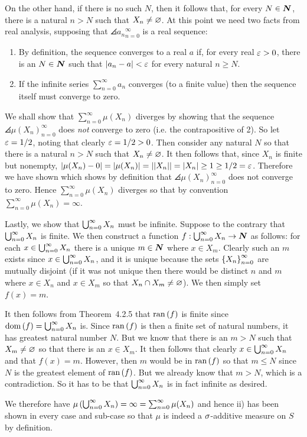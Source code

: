{{    On the other hand, if there is no such $N$, then it follows that, for every $N \in {\boldsymbol{N}}$, there is a natural $n > N$ such that $X_n \neq \varnothing$.
    At this point we need two facts from real analysis, supposing that $\angles{a_n}_{n=0}^\infty$ is a real sequence:
    \begin{enumerate}
    \item By definition, the sequence converges to a real $a$ if, for every real $\varepsilon > 0$, there is an $N \in {\boldsymbol{N}}$ such that $\left| a_n - a \right| < \varepsilon$ for every natural $n \geq N$.
    \item If the infinite series $\sum_{n=0}^\infty a_n$ converges (to a finite value) then the sequence itself must converge to zero.
    \end{enumerate}
    We shall show that $\sum_{n=0}^\infty \mu(X_n)$ diverges by showing that the sequence $\angles{\mu(X_n)}_{n=0}^\infty$ does \emph{not} converge to zero (i.e. the contrapositive of 2).
    So let $\varepsilon = 1/2$, noting that clearly $\varepsilon = 1/2 > 0$.
    Then consider any natural $N$ so that there is a natural $n > N$ such that $X_n \neq \varnothing$.
    It then follows that, since $X_n$ is finite but nonempty, $\left| \mu(X_n) - 0 \right| = \left| \mu(X_n) \right| = \left| \left| X_n \right| \right| = \left| X_n \right| \geq 1 \geq 1/2 = \varepsilon$.
    Therefore we have shown
    which shows by definition that $\angles{\mu(X_n)}_{n=0}^\infty$ does not converge to zero.
    Hence $\sum_{n=0}^\infty \mu(X_n)$ diverges so that by convention $\sum_{n=0}^\infty \mu(X_n) = \infty$.

    Lastly, we show that $\bigcup_{n=0}^\infty X_n$ must be infinite.
    Suppose to the contrary that $\bigcup_{n=0}^\infty X_n$ is finite.
    We then construct a function $f : \bigcup_{n=0}^\infty X_n \to {\boldsymbol{N}}$ as follows: for each $x \in \bigcup_{n=0}^\infty X_n$ there is a unique $m \in {\boldsymbol{N}}$ where $x \in X_m$.
    Clearly such an $m$ exists since $x \in \bigcup_{n=0}^\infty X_n$, and it is unique because the sets $\left\{ X_n \right\}_{n=0}^\infty$ are mutually disjoint (if it was not unique then there would be distinct $n$ and $m$ where $x \in X_n$ and $x \in X_m$ so that $X_n \cap X_m \neq \varnothing$).
    We then simply set $f(x) = m$.

    It then follows from Theorem~4.2.5 that $\mathrm{ran}\,(f)$ is finite since $\mathrm{dom}\,(f) = \bigcup_{n=0}^\infty X_n$ is.
    Since $\mathrm{ran}\,(f)$ is then a finite set of natural numbers, it has greatest natural number $N$.
    But we know that there is an $m > N$ such that $X_m \neq \varnothing$ so that there is an $x \in X_m$.
    It then follows that clearly $x \in \bigcup_{n=0}^\infty X_n$ and that $f(x) = m$.
    However, then $m$ would be in $\mathrm{ran}\,(f)$ so that $m \leq N$ since $N$ is the greatest element of $\mathrm{ran}\,(f)$.
    But we already know that $m > N$, which is a contradiction.
    So it has to be that $\bigcup_{n=0}^\infty X_n$ is in fact infinite as desired.

    We therefore have $\mu\left( \bigcup_{n=0}^\infty X_n \right) = \infty = \sum_{n=0}^\infty \mu(X_n)$ and hence ii) has been shown in every case and sub-case so that $\mu$ is indeed a $\sigma$-additive measure on $S$ by definition.
  }
}
